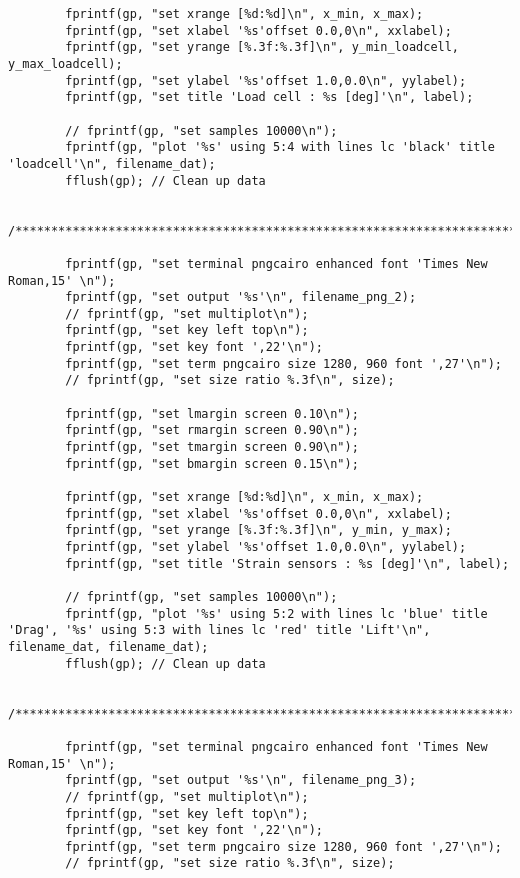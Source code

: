 \documentclass[12pt,a4paper]{jsarticle}
\begin{document}
{\begin{lstlisting}
        fprintf(gp, "set xrange [%d:%d]\n", x_min, x_max);
        fprintf(gp, "set xlabel '%s'offset 0.0,0\n", xxlabel);
        fprintf(gp, "set yrange [%.3f:%.3f]\n", y_min_loadcell, y_max_loadcell);
        fprintf(gp, "set ylabel '%s'offset 1.0,0.0\n", yylabel);
        fprintf(gp, "set title 'Load cell : %s [deg]'\n", label);
    
        // fprintf(gp, "set samples 10000\n");
        fprintf(gp, "plot '%s' using 5:4 with lines lc 'black' title 'loadcell'\n", filename_dat);
        fflush(gp); // Clean up data
    
        /*****************************************************************************/
    
        fprintf(gp, "set terminal pngcairo enhanced font 'Times New Roman,15' \n");
        fprintf(gp, "set output '%s'\n", filename_png_2);
        // fprintf(gp, "set multiplot\n");
        fprintf(gp, "set key left top\n");
        fprintf(gp, "set key font ',22'\n");
        fprintf(gp, "set term pngcairo size 1280, 960 font ',27'\n");
        // fprintf(gp, "set size ratio %.3f\n", size);
    
        fprintf(gp, "set lmargin screen 0.10\n");
        fprintf(gp, "set rmargin screen 0.90\n");
        fprintf(gp, "set tmargin screen 0.90\n");
        fprintf(gp, "set bmargin screen 0.15\n");
    
        fprintf(gp, "set xrange [%d:%d]\n", x_min, x_max);
        fprintf(gp, "set xlabel '%s'offset 0.0,0\n", xxlabel);
        fprintf(gp, "set yrange [%.3f:%.3f]\n", y_min, y_max);
        fprintf(gp, "set ylabel '%s'offset 1.0,0.0\n", yylabel);
        fprintf(gp, "set title 'Strain sensors : %s [deg]'\n", label);
    
        // fprintf(gp, "set samples 10000\n");
        fprintf(gp, "plot '%s' using 5:2 with lines lc 'blue' title 'Drag', '%s' using 5:3 with lines lc 'red' title 'Lift'\n", filename_dat, filename_dat);
        fflush(gp); // Clean up data
    
        /*****************************************************************************/
    
        fprintf(gp, "set terminal pngcairo enhanced font 'Times New Roman,15' \n");
        fprintf(gp, "set output '%s'\n", filename_png_3);
        // fprintf(gp, "set multiplot\n");
        fprintf(gp, "set key left top\n");
        fprintf(gp, "set key font ',22'\n");
        fprintf(gp, "set term pngcairo size 1280, 960 font ',27'\n");
        // fprintf(gp, "set size ratio %.3f\n", size);
    

\end{lstlisting}}
\end{document}
